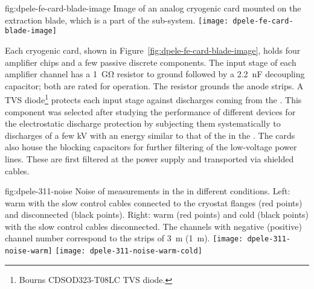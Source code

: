 \begin{dunefigure}{fig:dpele-fe-card-blade-image}
{Image of an analog cryogenic  card mounted on the extraction blade, which is a part of the  sub-system.}
\texttt{[image: dpele-fe-card-blade-image]}
\end{dunefigure}

Each cryogenic  card, shown in Figure~\ref{fig:dpele-fe-card-blade-image}, %
holds four  amplifier chips and a few passive discrete components. The input stage of each amplifier channel has a \SI{1}{\giga\ohm} resistor to ground followed by a \SI{2.2}{\nano\farad} decoupling capacitor; both are rated for  operation. The %
resistor grounds the  anode strips. A TVS diode\footnote{Bourns\texttrademark{} CDSOD323-T08LC TVS diode.} protects each input stage against discharges coming from the . This component was selected after studying the performance of different devices for the electrostatic discharge protection by subjecting them systematically to discharges of a few \si{kV} with an energy similar to that of the  in the . The  cards also house the blocking capacitors for further filtering of the low-voltage power lines. These are first filtered at the power supply and transported via shielded cables.

\begin{dunefigure}{fig:dpele-311-noise}
{Noise of measurements in the  in different conditions. Left: warm with the slow control cables connected to the cryostat flanges (red points) and disconnected (black points). Right: warm (red points) and cold (black points) with the slow control cables disconnected. The channels with negative (positive) channel number correspond to the strips of \SI{3}{\meter} (\SI{1}{\meter}).}
\texttt{[image: dpele-311-noise-warm]}
\texttt{[image: dpele-311-noise-warm-cold]}
\end{dunefigure}

